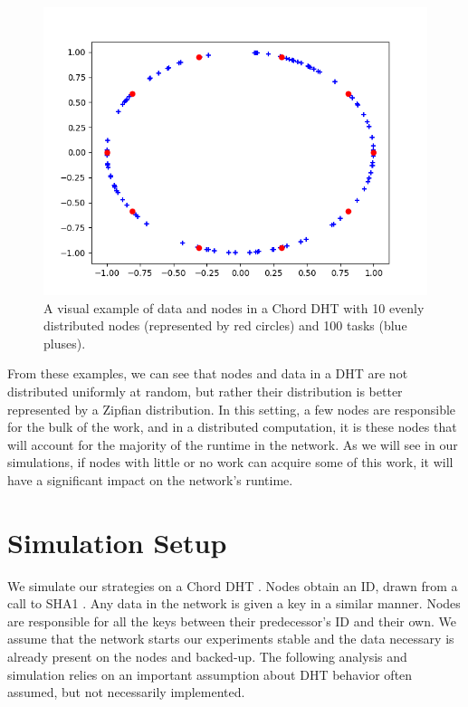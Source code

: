 \documentclass[10pt,conference]{IEEEtran}
\begin{document}
\begin{figure}
	\centering
	\includegraphics[width=0.9\linewidth]{figs/exampleChordEvenRedone}
	\caption[Distribution of Tasks in a Chord DHT  with Evenly Distributed Nodes]{A visual example of data and nodes in a Chord DHT with 10 evenly distributed nodes (represented by red circles) and 100 tasks (blue pluses).}
	\label{fig:exampleChordEvenDistribution}
\end{figure}

From these examples, we can see that nodes and data in a DHT are not distributed uniformly at random, but rather their distribution is better represented by  a Zipfian distribution.
In this setting, a few nodes are responsible for the bulk of the work, and in a distributed computation, it is these nodes that will account for the majority of the runtime in the network.
As we will see in our simulations, if nodes with little or no work can acquire some of this work, it will have a significant impact on the network's runtime.



\section{Simulation Setup}
\label{sec:auto-simulation}



We simulate our strategies on a Chord DHT \cite{chord}.
Nodes obtain an ID, drawn from a call to SHA1 \cite{sha1}.
Any data in the network is given a key in a similar manner.
Nodes are responsible for all the keys between their predecessor's ID and their own.
We assume that the network starts our experiments stable and the data necessary is already present on the nodes and backed-up.
The following analysis and simulation relies on an important assumption about DHT behavior often assumed, but not necessarily implemented.
\end{document}
